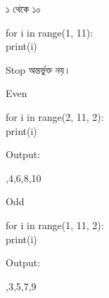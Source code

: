 \noindent
\begin{minipage}[t]{0.32\linewidth}

\begin{sideexamplebox}{১ থেকে ১০}

\begin{sidecodebox}
\begin{english}
\ttfamily
for i in range(1, 11):\\
\hspace*{4mm}print(i)
\end{english}
\end{sidecodebox}

Stop
\textenglish{}
অন্তর্ভুক্ত নয়।

\end{sideexamplebox}

\end{minipage}
\hfill
\begin{minipage}[t]{0.32\linewidth}

\begin{sideexamplebox}{Even}

\begin{sidecodebox}
\begin{english}
\ttfamily
for i in range(2, 11, 2):\\
\hspace*{4mm}print(i)
\end{english}
\end{sidecodebox}

Output:

\begin{center}
\textenglish{,4,6,8,10}
\end{center}

\end{sideexamplebox}

\end{minipage}
\hfill
\begin{minipage}[t]{0.32\linewidth}

\begin{sideexamplebox}{Odd}

\begin{sidecodebox}
\begin{english}
\ttfamily
for i in range(1, 11, 2):\\
\hspace*{4mm}print(i)
\end{english}
\end{sidecodebox}

Output:

\begin{center}
\textenglish{,3,5,7,9}
\end{center}

\end{sideexamplebox}

\end{minipage}

